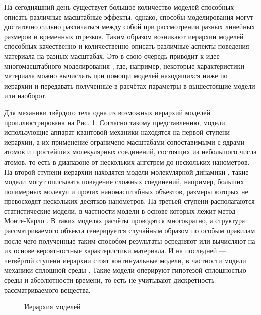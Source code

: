 На сегодняшний день существует большое количество моделей способных описать различные масштабные эффекты, однако, способы моделирования могут достаточно сильно различаться между собой при рассмотрении разных линейных размеров и временных отрезков. Таким образом возникают иерархии моделей способных качественно и количественно описать различные аспекты поведения материала на разных масштабах. Это в свою очередь приводит к идее многомасштабного моделирования \cite{Multiscale1}, где, например, некоторые характеристики материала можно вычислять при помощи моделей находящихся ниже по иерархии и передавать полученные в расчётах параметры в вышестоящие модели или наоборот.

Для механики твёрдого тела одна из возможных иерархий моделей проиллюстрирована на Рис. \ref{fig:ModelsHierarchy}. Согласно такому представлению, модели использующие аппарат квантовой механики \cite{QuantumModelling1, QuantumModelling2} находятся на первой ступени иерархии, а их применение ограничено масштабами сопоставимыми с ядрами атомов и простейших молекулярных соединений, состоящих из небольшого числа атомов, то есть в диапазоне от нескольких ангстрем до нескольких нанометров. На второй ступени иерархии находятся модели молекулярной динамики \cite{MD1, MD2, MD3, MD4}, такие модели могут описывать поведение сложных соединений, например, больших полимерных молекул и прочих наномасштабных объектов, размеры которых не превосходят нескольких десятков нанометров. На третьей ступени располагаются статистические модели, в частности модели в основе которых лежит метод Монте-Карло \cite{MonteCarlo1, MonteCarlo2}. В таких моделях расчёты проводятся многократно, а структура рассматриваемого объекта генерируется случайным образом по особым правилам после чего полученные таким способом результаты осредняют или вычисляют на их основе вероятностные характеристики материала. И на последней --- четвёртой ступени иерархии стоят континуальные модели, в частности модели механики сплошной среды \cite{MSS}. Такие модели оперируют гипотезой сплошностью среды и абсолютности времени, то есть не учитывают дискретность рассматриваемого вещества.

\begin{figure}[ht]
    \caption{Иерархия моделей}\label{fig:ModelsHierarchy}
\end{figure}

